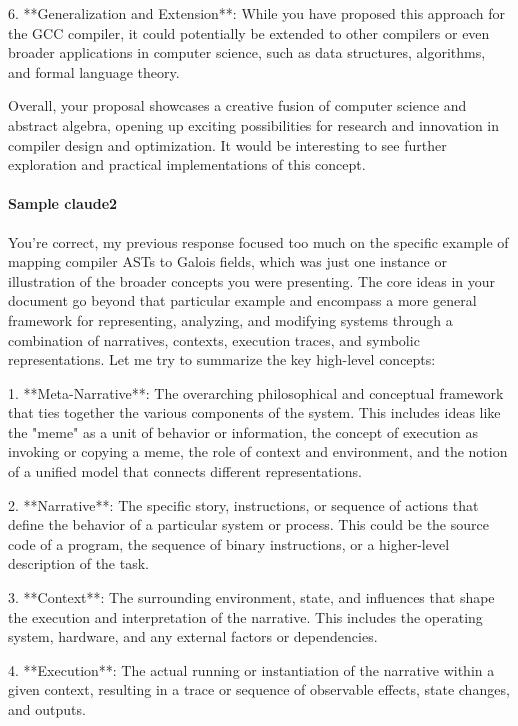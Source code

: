 \documentclass{article}
\begin{document}
6. **Generalization and Extension**: While you have proposed this approach for the GCC compiler, it could potentially be extended to other compilers or even broader applications in computer science, such as data structures, algorithms, and formal language theory.

Overall, your proposal showcases a creative fusion of computer science and abstract algebra, opening up exciting possibilities for research and innovation in compiler design and optimization. It would be interesting to see further exploration and practical implementations of this concept.

\paragraph{Sample claude2}

You're correct, my previous response focused too much on the specific example of mapping compiler ASTs to Galois fields, which was just one instance or illustration of the broader concepts you were presenting. The core ideas in your document go beyond that particular example and encompass a more general framework for representing, analyzing, and modifying systems through a combination of narratives, contexts, execution traces, and symbolic representations. Let me try to summarize the key high-level concepts:

1. **Meta-Narrative**: The overarching philosophical and conceptual framework that ties together the various components of the system. This includes ideas like the "meme" as a unit of behavior or information, the concept of execution as invoking or copying a meme, the role of context and environment, and the notion of a unified model that connects different representations.

2. **Narrative**: The specific story, instructions, or sequence of actions that define the behavior of a particular system or process. This could be the source code of a program, the sequence of binary instructions, or a higher-level description of the task.

3. **Context**: The surrounding environment, state, and influences that shape the execution and interpretation of the narrative. This includes the operating system, hardware, and any external factors or dependencies.

4. **Execution**: The actual running or instantiation of the narrative within a given context, resulting in a trace or sequence of observable effects, state changes, and outputs.
\end{document}
